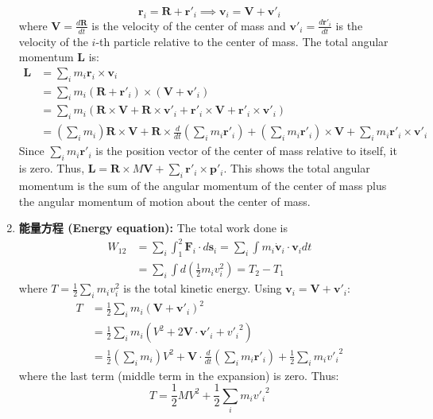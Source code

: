 \documentclass[12pt,a4paper]{article}
\theoremstyle{definition}
\theoremstyle{remark}
\renewcommand{\vec}[1]{\mathbf{#1}}
\begin{document}
\begin{enumerate}
\begin{figure}[h!]
		\end{figure} %
		\begin{equation*}
			\vec{r}_i = \vec{R} + \vec{r}'_i \implies \vec{v}_i = \vec{V} + \vec{v}'_i
		\end{equation*}
		where $\vec{V} = \frac{d\vec{R}}{dt}$ is the velocity of the center of mass and $\vec{v}'_i = \frac{d\vec{r}'_i}{dt}$ is the velocity of the $i$-th particle relative to the center of mass.
		The total angular momentum $\vec{L}$ is:
		\begin{align*}
			\vec{L} &= \sum_i m_i \vec{r}_i \times \vec{v}_i \\
			&= \sum_i m_i (\vec{R} + \vec{r}'_i) \times (\vec{V} + \vec{v}'_i) \\
			&= \sum_i m_i (\vec{R} \times \vec{V} + \vec{R} \times \vec{v}'_i + \vec{r}'_i \times \vec{V} + \vec{r}'_i \times \vec{v}'_i) \\
			&= (\sum_i m_i) \vec{R} \times \vec{V} + \vec{R} \times \frac{d}{dt}(\sum_i m_i\vec{r}'_i) + (\sum_i m_i\vec{r}'_i) \times \vec{V} + \sum_i m_i \vec{r}'_i \times \vec{v}'_i
		\end{align*}
		Since $\sum_i m_i \vec{r}'_i$ is the position vector of the center of mass relative to itself, it is zero.
		Thus, $\vec{L} = \vec{R} \times M\vec{V} + \sum_i \vec{r}'_i \times \vec{p}'_i$.
		This shows the total angular momentum is the sum of the angular momentum of the center of mass plus the angular momentum of motion about the center of mass.
		
		\item \textbf{能量方程 (Energy equation):} The total work done is
		\begin{align*}
			W_{12} &= \sum_i \int_1^2 \vec{F}_i \cdot d\vec{s}_i = \sum_i \int m_i \dot{\vec{v}}_i \cdot \vec{v}_i dt \\
			&= \sum_i \int d(\frac{1}{2} m_i v_i^2) = T_2 - T_1
		\end{align*}
		where $T = \frac{1}{2}\sum_i m_i v_i^2$ is the total kinetic energy. Using $\vec{v}_i = \vec{V} + \vec{v}'_i$:
		\begin{align*}
			T &= \frac{1}{2}\sum_i m_i (\vec{V} + \vec{v}'_i)^2 \\
			&= \frac{1}{2}\sum_i m_i (V^2 + 2\vec{V}\cdot\vec{v}'_i + {v'_i}^2) \\
			&= \frac{1}{2}(\sum_i m_i)V^2 + \vec{V}\cdot\frac{d}{dt}(\sum_i m_i\vec{r}'_i) + \frac{1}{2}\sum_i m_i {v'_i}^2
		\end{align*}
		where the last term (middle term in the expansion) is zero. Thus:
		\begin{equation*}
			T = \frac{1}{2}MV^2 + \frac{1}{2}\sum_i m_i {v'_i}^2
		\end{equation*}
		

\end{enumerate}
\end{document}
